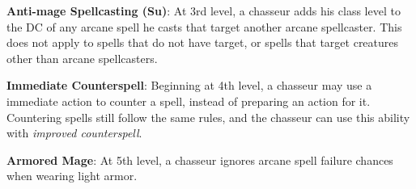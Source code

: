 {\textbf{Anti-mage Spellcasting (Su)}: At 3rd level, a chasseur adds his class level to the DC of any arcane spell he casts that target another arcane spellcaster. This does not apply to spells that do not have target, or spells that target creatures other than arcane spellcasters.

\textbf{Immediate Counterspell}: Beginning at 4th level, a chasseur may use a immediate action to counter a spell, instead of preparing an action for it. Countering spells still follow the same rules, and the chasseur can use this ability with \emph{improved counterspell}.

\textbf{Armored Mage}: At 5th level, a chasseur ignores arcane spell failure chances when wearing light armor.

}
